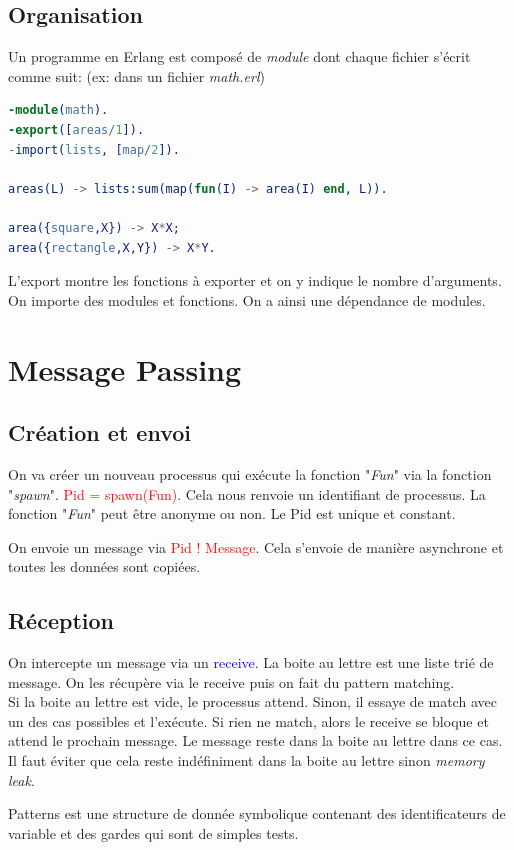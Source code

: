 \documentclass{report}
\begin{document}
\subsection{Organisation}
Un programme en Erlang est composé de \textit{module} dont chaque fichier s'écrit comme suit: (ex: dans un fichier \textit{math.erl})
\begin{lstlisting}[escapechar=\%, language=erlang]
-module(math).
-export([areas/1]).
-import(lists, [map/2]). 

areas(L) -> lists:sum(map(fun(I) -> area(I) end, L)).

area({square,X}) -> X*X;
area({rectangle,X,Y}) -> X*Y.
\end{lstlisting}
L'export montre les fonctions à exporter et on y indique le nombre d'arguments. On importe des modules et fonctions. On a ainsi une dépendance de modules.

\section{Message Passing}
\subsection{Création et envoi}
On va créer un nouveau processus qui exécute la fonction "\textit{Fun}" via la fonction "\textit{spawn}". \textcolor{red}{Pid = spawn(Fun)}. Cela nous renvoie un identifiant de processus. La fonction "\textit{Fun}" peut être anonyme ou non. Le Pid est unique et constant. \par 
On envoie un message via \textcolor{red}{Pid ! Message}. Cela s'envoie de manière asynchrone et toutes les données sont copiées.

\subsection{Réception}
On intercepte un message via un \textcolor{blue}{receive}. La boite au lettre est une liste trié de message. On les récupère via le receive puis on fait du pattern matching.\\
Si la boite au lettre est vide, le processus attend. Sinon, il essaye de match avec un des cas possibles et l'exécute. Si rien ne match, alors le receive se bloque et attend le prochain message. Le message reste dans la boite au lettre dans ce cas. Il faut éviter que cela reste indéfiniment dans la boite au lettre sinon \textit{memory leak}. \par
Patterns est une structure de donnée symbolique contenant des identificateurs de variable et des gardes qui sont de simples tests.
\end{document}

